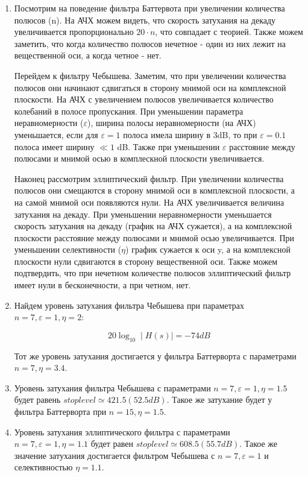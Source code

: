 \documentclass[a4paper, 12pt]{article}%
\begin{document}
\begin{enumerate}

\item Посмотрим на поведение фильтра Баттервота при увеличении количества полюсов (n). На АЧХ можем видеть, что скорость затухания на декаду увеличивается пропорционально $20\cdot n$, что совпадает с теорией. Также можем заметить, что когда количество полюсов нечетное - один из них лежит на вещественной оси, а когда четное - нет.

Перейдем к фильтру Чебышева. Заметим, что при увеличении количества полюсов они начинают сдвигаться в сторону мнимой оси на комплексной плоскости. На АЧХ с увеличением полюсов увеличивается количество колебаний в полосе пропускания. При уменьшении параметра неравномерности ($\varepsilon$), ширина полосы неравномерности (на АЧХ) уменьшается, если для $\varepsilon = 1$ полоса имела ширину в 3dB, то при $\varepsilon = 0.1$ полоса имеет ширину $\ll 1$ dB. Также при уменьшении $\varepsilon$ расстояние между полюсами и мнимой осью в комплескной плоскости увеличивается.

Наконец рассмотрим эллиптический фильтр. При увеличении количества полюсов они смещаются в сторону мнимой оси в комплексной плоскости, а на самой мнимой оси появляются нули. На АЧХ увеличивается величина затухания на декаду. При уменьшении неравномерности уменьшается скорость затухания на декаду (график на АЧХ сужается), а на комплексной плоскости расстояние между полюсами и мнимой осью увеличивается. При уменьшении селективности ($\eta$) график сужается к оси y, а на комплексной плоскости нули сдвигаются в сторону вещественной оси. Также можем подтвердить, что при нечетном количестве полюсов эллиптический фильтр имеет нули в бесконечности, а при четном, нет.

\item Найдем уровень затухания фильтра Чебышева при параметрах $n = 7, \varepsilon = 1, \eta = 2$:

\[20 \log_10 \mid H(s)\mid = -74 dB\]

Тот же уровень затухания достигается у фильтра Баттерворта с параметрами $n = 7, \eta = 3.4$.

\item Уровень затухания фильтра Чебышева с параметрами $n = 7, \varepsilon = 1, \eta = 1.5$ будет равень $stoplevel \simeq 421.5 (52.5 dB)$. Такое же затухание будет у фильтра Баттерворта при $n = 15, \eta = 1.5$.

\item Уровень затухания эллиптического фильтра с параметрами $n = 7, \varepsilon = 1, \eta = 1.1$ будет равен $stoplevel \simeq 608.5 (55.7 dB)$. Такое же значение затухания достигается фильтром Чебышева с $n = 7, \varepsilon = 1$ и селективностью $\eta = 1.1$.


\end{enumerate}
\end{document}
